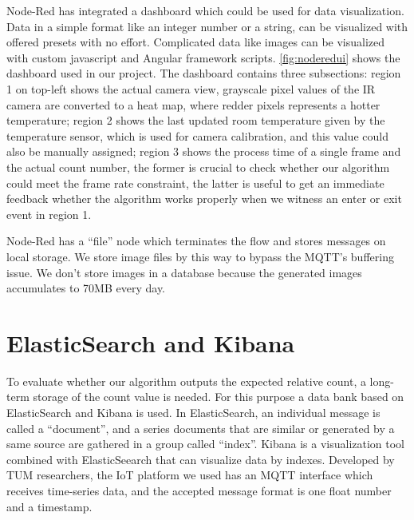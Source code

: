 Node-Red has integrated a dashboard which could be used for data visualization. Data in a simple format like an integer number or a string, can be visualized with offered presets with no effort. Complicated data like images can be visualized with custom javascript and Angular framework scripts. \autoref{fig:noderedui} shows the dashboard used in our project. The dashboard contains three subsections: region 1 on top-left shows the actual camera view, grayscale pixel values of the IR camera are converted to a heat map, where redder pixels represents a hotter temperature; region 2 shows the last updated room temperature given by the temperature sensor, which is used for camera calibration, and this value could also be manually assigned; region 3 shows the process time of a single frame and the actual count number, the former is crucial to check whether our algorithm could meet the frame rate constraint, the latter is useful to get an immediate feedback whether the algorithm works properly when we witness an enter or exit event in region 1.

Node-Red has a ``file'' node which terminates the flow and stores messages on local storage. We store image files by this way to bypass the MQTT's buffering issue. We don't store images in a database because the generated images accumulates to 70MB every day.
%
\section{ElasticSearch and Kibana}
To evaluate whether our algorithm outputs the expected relative count, a long-term storage of the count value is needed. For this purpose a data bank based on ElasticSearch and Kibana is used. In ElasticSearch, an individual message is called a ``document'', and a series documents that are similar or generated by a same source are gathered in a group called ``index''. Kibana is a visualization tool combined with ElasticSeearch that can visualize data by indexes. Developed by TUM researchers, the IoT platform we used has an MQTT interface which receives time-series data, and the accepted message format is one float number and a timestamp.

